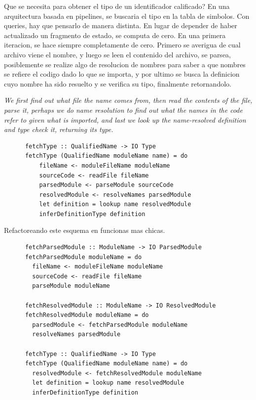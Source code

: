 \documentclass[12pt, a4paper]{report}
\begin{document}
      Que se necesita para obtener el tipo de un identificador calificado?
      En una arquitectura basada en pipelines, se buscaria el tipo en la tabla de simbolos.
      Con queries, hay que pensarlo de manera distinta.
      En lugar de depender de haber actualizado un fragmento de estado, se computa de cero.
      En una primera iteracion, se hace siempre completamente de cero.
      Primero se averigua de cual archivo viene el nombre, y luego se leen el contenido del archivo, se parsea, posiblemente se realize algo de resolucion de nombres para saber a que nombres se refiere el codigo dado lo que se importa, y por ultimo se busca la definicion cuyo nombre ha sido resuelto y se verifica su tipo, finalmente retornandolo.

      \textit{We first find out what file the name comes from, then read the contents of the file, parse it, perhaps we do name resolution to find out what the names in the code refer to given what is imported, and last we look up the name-resolved definition and type check it, returning its type.}

      \begin{verbatim}
      fetchType :: QualifiedName -> IO Type
      fetchType (QualifiedName moduleName name) = do
          fileName <- moduleFileName moduleName
          sourceCode <- readFile fileName
          parsedModule <- parseModule sourceCode
          resolvedModule <- resolveNames parsedModule
          let definition = lookup name resolvedModule
          inferDefinitionType definition
      \end{verbatim}

      Refactoreando este esquema en funcionas mas chicas.

      \begin{verbatim}
      fetchParsedModule :: ModuleName -> IO ParsedModule
      fetchParsedModule moduleName = do
        fileName <- moduleFileName moduleName
        sourceCode <- readFile fileName
        parseModule moduleName

      fetchResolvedModule :: ModuleName -> IO ResolvedModule
      fetchResolvedModule moduleName = do
        parsedModule <- fetchParsedModule moduleName
        resolveNames parsedModule

      fetchType :: QualifiedName -> IO Type
      fetchType (QualifiedName moduleName name) = do
        resolvedModule <- fetchResolvedModule moduleName
        let definition = lookup name resolvedModule
        inferDefinitionType definition
      \end{verbatim}
\end{document}

